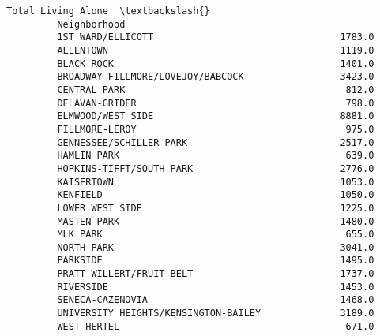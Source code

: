 \documentclass[11pt]{article}
\begin{document}
\begin{Verbatim}[commandchars=\\\{\}]
                                               Total Living Alone  \textbackslash{}
         Neighborhood                                               
         1ST WARD/ELLICOTT                                 1783.0   
         ALLENTOWN                                         1119.0   
         BLACK ROCK                                        1401.0   
         BROADWAY-FILLMORE/LOVEJOY/BABCOCK                 3423.0   
         CENTRAL PARK                                       812.0   
         DELAVAN-GRIDER                                     798.0   
         ELMWOOD/WEST SIDE                                 8881.0   
         FILLMORE-LEROY                                     975.0   
         GENNESSEE/SCHILLER PARK                           2517.0   
         HAMLIN PARK                                        639.0   
         HOPKINS-TIFFT/SOUTH PARK                          2776.0   
         KAISERTOWN                                        1053.0   
         KENFIELD                                          1050.0   
         LOWER WEST SIDE                                   1225.0   
         MASTEN PARK                                       1480.0   
         MLK PARK                                           655.0   
         NORTH PARK                                        3041.0   
         PARKSIDE                                          1495.0   
         PRATT-WILLERT/FRUIT BELT                          1737.0   
         RIVERSIDE                                         1453.0   
         SENECA-CAZENOVIA                                  1468.0   
         UNIVERSITY HEIGHTS/KENSINGTON-BAILEY              3189.0   
         WEST HERTEL                                        671.0   
         

\end{Verbatim}
\end{document}

